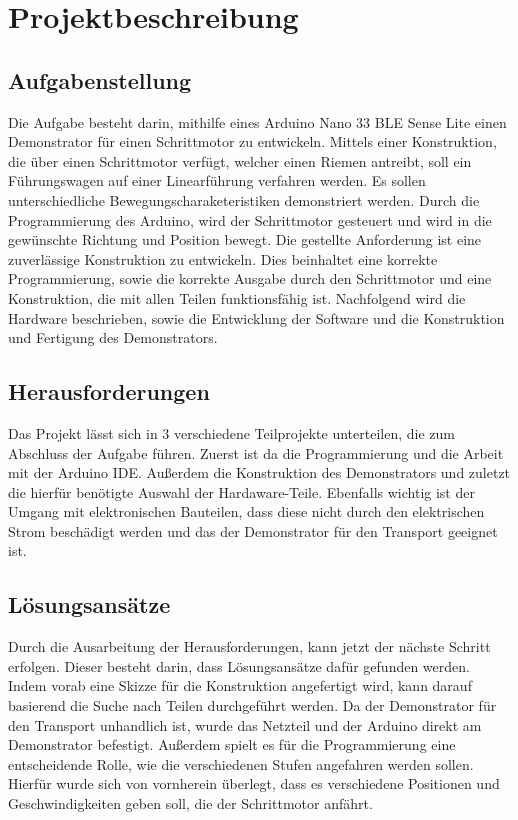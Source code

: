 

\chapter{Projektbeschreibung}

\section{Aufgabenstellung}

Die Aufgabe besteht darin, mithilfe eines Arduino Nano 33 BLE Sense Lite einen Demonstrator für einen Schrittmotor zu entwickeln. Mittels einer Konstruktion, die über einen Schrittmotor verfügt, welcher einen Riemen antreibt, soll ein Führungswagen auf einer Linearführung verfahren werden. Es sollen unterschiedliche Bewegungscharaketeristiken demonstriert werden. Durch die Programmierung des Arduino, wird der Schrittmotor gesteuert und wird in die gewünschte Richtung und Position bewegt. Die gestellte Anforderung ist eine zuverlässige Konstruktion zu entwickeln. Dies beinhaltet eine korrekte Programmierung, sowie die korrekte Ausgabe durch den Schrittmotor und eine Konstruktion, die mit allen Teilen funktionsfähig ist. Nachfolgend wird die Hardware beschrieben, sowie die Entwicklung der Software und die Konstruktion und Fertigung des Demonstrators.

\section{Herausforderungen}

Das Projekt lässt sich in 3 verschiedene Teilprojekte unterteilen, die zum Abschluss der Aufgabe führen. Zuerst ist da die Programmierung und die Arbeit mit der Arduino IDE. Außerdem die Konstruktion des Demonstrators und zuletzt die hierfür benötigte Auswahl der Hardaware-Teile. Ebenfalls wichtig ist der Umgang mit elektronischen Bauteilen, dass diese nicht durch den elektrischen Strom beschädigt werden und das der Demonstrator für den Transport geeignet ist. 

\section{Lösungsansätze}

Durch die Ausarbeitung der Herausforderungen, kann jetzt der nächste Schritt erfolgen. Dieser besteht darin, dass Lösungsansätze dafür gefunden werden. Indem vorab eine Skizze für die Konstruktion angefertigt wird, kann darauf basierend die Suche nach Teilen durchgeführt werden. Da der Demonstrator für den Transport unhandlich ist, wurde das Netzteil und der Arduino direkt am Demonstrator befestigt. Außerdem spielt es für die Programmierung eine entscheidende Rolle, wie die verschiedenen Stufen angefahren werden sollen. Hierfür wurde sich von vornherein überlegt, dass es verschiedene Positionen und Geschwindigkeiten geben soll, die der Schrittmotor anfährt.




